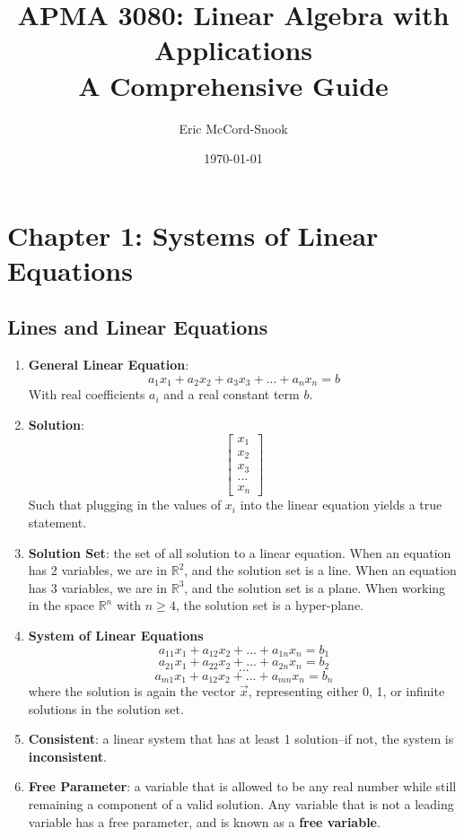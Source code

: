 \documentclass[10pt]{article}
\begin{document}
\title{APMA 3080: Linear Algebra with Applications \\ A Comprehensive Guide}
\author{Eric McCord-Snook}
\date{\today}
\maketitle
\section{Chapter 1: Systems of Linear Equations}
\subsection{Lines and Linear Equations}
\begin{enumerate}
\item \textbf{General Linear Equation}:
$$a_1x_1 + a_2x_2 + a_3x_3 + ... + a_nx_n = b$$
With real coefficients $a_i$ and a real constant term $b$. 
\item \textbf{Solution}:
$$\begin{bmatrix}
x_1\\ x_2\\ x_3\\ ...\\ x_n
\end{bmatrix}$$
Such that plugging in the values of $x_i$ into the linear equation yields a true statement.
\item \textbf{Solution Set}: the set of all solution to a linear equation. When an equation has 2 variables, we are in $\mathbb{R}^2$, and the solution set is a line. When an equation has 3 variables, we are in $\mathbb{R}^3$, and the solution set is a plane. When working in the space $\mathbb{R}^n$ with $n \geq 4$, the solution set is a hyper-plane. 
\item \textbf{System of Linear Equations}
$$a_{11}x_1 + a_{12}x_2 + ... + a_{1n}x_n = b_1$$
$$a_{21}x_1 + a_{22}x_2 + ... + a_{2n}x_n = b_2$$
$$...$$
$$a_{m1}x_1 + a_{12}x_2 + ... + a_{mn}x_n = b_n$$
where the solution is again the vector $\vec{x}$, representing either 0, 1, or infinite solutions in the solution set.
\item \textbf{Consistent}: a linear system that has at least 1 solution--if not, the system is \textbf{inconsistent}.
\item \textbf{Free Parameter}: a variable that is allowed to be any real number while still remaining a component of a valid solution. Any variable that is not a leading variable has a free parameter, and is known as a \textbf{free variable}.

\end{enumerate}
\end{document}
